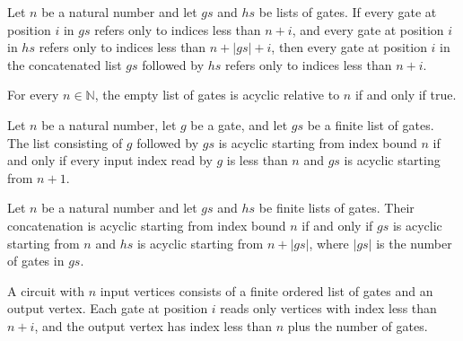 \begin{theorem}
\label{BoolCircuit.GatesAcyclic.append}
\leanok
{}
Let $n$ be a natural number and let $gs$ and $hs$ be lists of gates. If every gate at
position $i$ in $gs$ refers only to indices less than $n+i$, and every gate at position
$i$ in $hs$ refers only to indices less than $n+|gs|+i$, then every gate at position $i$
in the concatenated list $gs$ followed by $hs$ refers only to indices less than $n+i$.
\end{theorem}

\begin{theorem}
\label{BoolCircuit.gatesAcyclic_nil}
\leanok
{}
For every $n\in\mathbb{N}$, the empty list of gates is acyclic relative to $n$ if and
only if true.
\end{theorem}

\begin{theorem}
\label{BoolCircuit.gatesAcyclic_cons}
\leanok
{}
Let $n$ be a natural number, let $g$ be a gate, and let $gs$ be a finite list of gates.
The list consisting of $g$ followed by $gs$ is acyclic starting from index bound $n$ if
and only if every input index read by $g$ is less than $n$ and $gs$ is acyclic starting
from $n+1$.
\end{theorem}

\begin{theorem}
\label{BoolCircuit.gatesAcyclic_append}
\leanok
{}
Let $n$ be a natural number and let $gs$ and $hs$ be finite lists of gates. Their
concatenation is acyclic starting from index bound $n$ if and only if $gs$ is acyclic
starting from $n$ and $hs$ is acyclic starting from $n+|gs|$, where $|gs|$ is the number
of gates in $gs$.
\end{theorem}

\begin{definition}
\label{BoolCircuit.DAGCircuit}
\leanok
{}
A circuit with $n$ input vertices consists of a finite ordered list of gates and an
output vertex. Each gate at position $i$ reads only vertices with index less than $n+i$,
and the output vertex has index less than $n$ plus the number of gates.
\end{definition}

